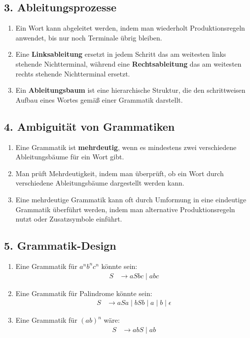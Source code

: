 \documentclass[a4paper,12pt]{article}
\begin{document}
	\subsection*{3. Ableitungsprozesse}
	\begin{enumerate}
		\item Ein Wort kann abgeleitet werden, indem man wiederholt Produktionsregeln anwendet, bis nur noch Terminale übrig bleiben.
		
		\item Eine \textbf{Linksableitung} ersetzt in jedem Schritt das am weitesten links stehende Nichtterminal, während eine \textbf{Rechtsableitung} das am weitesten rechts stehende Nichtterminal ersetzt.
		
		\item Ein \textbf{Ableitungsbaum} ist eine hierarchische Struktur, die den schrittweisen Aufbau eines Wortes gemäß einer Grammatik darstellt.
	\end{enumerate}
	
	\subsection*{4. Ambiguität von Grammatiken}
	\begin{enumerate}
		\item Eine Grammatik ist \textbf{mehrdeutig}, wenn es mindestens zwei verschiedene Ableitungsbäume für ein Wort gibt.
		
		\item Man prüft Mehrdeutigkeit, indem man überprüft, ob ein Wort durch verschiedene Ableitungsbäume dargestellt werden kann.
		
		\item Eine mehrdeutige Grammatik kann oft durch Umformung in eine eindeutige Grammatik überführt werden, indem man alternative Produktionsregeln nutzt oder Zusatzsymbole einführt.
	\end{enumerate}
	
	\subsection*{5. Grammatik-Design}
	\begin{enumerate}
		\item Eine Grammatik für $a^n b^n c^n$ könnte sein:
		\begin{align*}
			S &\rightarrow a S b c \mid abc
		\end{align*}
		
		\item Eine Grammatik für Palindrome könnte sein:
		\begin{align*}
			S &\rightarrow a S a \mid b S b \mid a \mid b \mid \epsilon
		\end{align*}
		
		\item Eine Grammatik für $(ab)^n$ wäre:
		\begin{align*}
			S &\rightarrow ab S \mid ab
		\end{align*}
	\end{enumerate}
	
\end{document}
